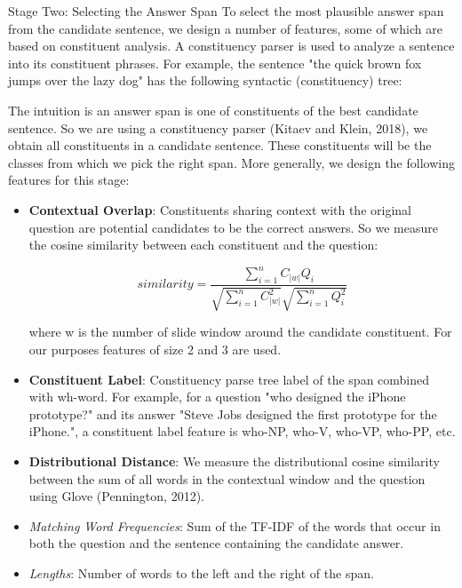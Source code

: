 Stage Two: Selecting the Answer Span
To select the most plausible answer span from the candidate sentence, we design a number of features, some of which are based on constituent analysis. A constituency parser is used to analyze a sentence into its constituent phrases. For example, the sentence "the quick brown fox jumps over the lazy dog" has the following syntactic (constituency) tree:


The intuition is an answer span is one of constituents of the best candidate sentence. So we are using a constituency parser (Kitaev and Klein, 2018), we obtain all constituents in a candidate sentence. These constituents will be the classes from which we pick the right span. More generally, we design the following features for this stage:

\begin{itemize}
\item \textbf{Contextual Overlap}: Constituents sharing context with the original question are potential candidates to be the correct answers. So we measure the cosine similarity between each constituent and the question:

$${ similarity } = \frac { \sum _ { i = 1 } ^ { n } C _ { |w| } Q _ { i } } { \sqrt { \sum _ { i = 1 } ^ { n } C _ { |w| } ^ { 2 } } \sqrt { \sum _ { i = 1 } ^ { n } Q _ { i } ^ { 2 } } }$$ 

where w is the number of slide window around the candidate constituent. For our purposes features of size 2 and 3 are used.


\item \textbf{Constituent Label}: Constituency parse tree label of the span combined with wh-word. For example, for a question "who designed the iPhone prototype?" and its answer "Steve Jobs designed the first prototype for the iPhone.", a constituent label feature is {who-NP, who-V, who-VP, who-PP, etc}. 
\item \textbf{Distributional Distance}: We measure the distributional cosine similarity between the sum of all words in the contextual window and the question using Glove (Pennington, 2012).
\item \emph{Matching Word Frequencies}: Sum of the TF-IDF of the words that occur in both the question and the sentence containing the candidate answer.
\item \emph{Lengths}: Number of words to the left and the right of the span.
\end{itemize}

